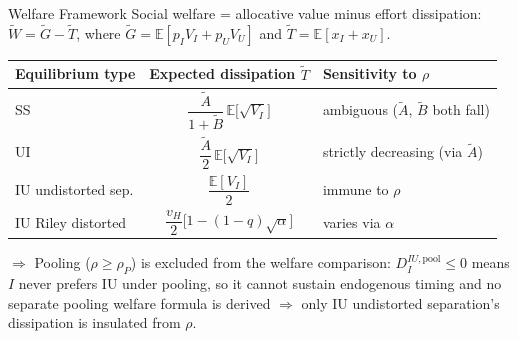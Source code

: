 \documentclass[aspectratio=169, 12pt]{beamer}
\newcommand{\E}{\mathbb{E}}
\newcommand{\rhopool}{\rho_{P}}
\begin{document}
\begin{frame}{Welfare Framework}
  Social welfare = allocative value minus effort dissipation:
  $\widetilde W = \widetilde G - \widetilde T$,
  where $\widetilde G = \E[p_I V_I + p_U V_U]$
  and $\widetilde T = \E[x_I + x_U]$.

  \begin{center}
    \footnotesize
    \renewcommand{\arraystretch}{1.5}
    \begin{tabular}{@{}lcl@{}}
      \toprule
      Equilibrium type & Expected dissipation $\widetilde T$
        & Sensitivity to $\rho$ \\
      \midrule
      SS
        & $\dfrac{\tilde A}{1+\tilde B}\,\E\bigl[\sqrt{V_I}\bigr]$
        & ambiguous ($\tilde A$, $\tilde B$ both fall) \\
      UI
        & $\dfrac{\tilde A}{2}\,\E\bigl[\sqrt{V_I}\bigr]$
        & strictly decreasing (via $\tilde A$) \\
      IU undistorted sep.
        & $\dfrac{\E[V_I]}{2}$
        & immune to $\rho$ \\
      IU Riley distorted
        & $\dfrac{v_H}{2}\bigl[1-(1-q)\sqrt{\alpha}\bigr]$
        & varies via $\alpha$ \\
      \bottomrule
    \end{tabular}
  \end{center}

  {\small $\Rightarrow$ Pooling ($\rho\ge\rhopool$) is excluded from the welfare
  comparison: $D_I^{IU,\mathrm{pool}}\le 0$ means $I$ never prefers IU
  under pooling, so it cannot sustain endogenous timing and no separate
  pooling welfare formula is derived $\Rightarrow$ only IU undistorted
  separation's dissipation is insulated from $\rho$.}
\end{frame}
\end{document}
